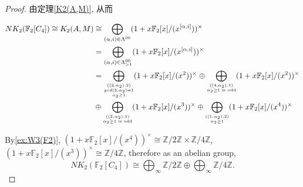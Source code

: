 \begin{proof}


由定理\ref{K2(A,M)}, 从而

\begin{align*}
NK_2(\mathbb{F}_2[C_4])\cong K_2(A,M) &\cong \bigoplus_{(\alpha,i)\in\Lambda^{00}}(1+x\mathbb{F}_2[x]/(x^{[\alpha,i]}))^{\times}\\
& = \bigoplus_{(\alpha,i)\in \Lambda^{00}_{>1}}(1+x\mathbb{F}_2[x]/(x^{[\alpha,i]}))^{\times}\\
& = \bigoplus_{\scriptsize\substack{((3,\alpha_2),2) \\ gcd(3,\alpha_2)=1 \\ \alpha_2\geq 1}}(1+x\mathbb{F}_2[x]/(x^{2}))^{\times}\oplus \bigoplus_{\scriptsize\substack{((4,\alpha_2),1) \\ \alpha_2\geq 1\text{ is odd}}}(1+x\mathbb{F}_2[x]/(x^{2}))^{\times} \\
& \oplus \bigoplus_{\scriptsize\substack{((2,\alpha_2),1) \\ \alpha_2\geq 1\text{ is odd}}}(1+x\mathbb{F}_2[x]/(x^{3}))^{\times} \oplus \bigoplus_{\scriptsize\substack{((1,\alpha_2),2) \\ \alpha_2\geq 1}}(1+x\mathbb{F}_2[x]/(x^{4}))^{\times}
\end{align*}

By\ref{ex:W3(F2)}, $(1+x\mathbb{F}_2[x]/(x^{4}))^{\times}\cong \mathbb{Z}/2 \mathbb{Z}\times \mathbb{Z}/4 \mathbb{Z}$, $(1+x\mathbb{F}_2[x]/(x^{3}))^{\times}\cong \mathbb{Z}/4 \mathbb{Z}$, therefore as an abelian group,
\[NK_2(\mathbb{F}_2[C_4]) \cong \bigoplus_{\infty} \mathbb{Z}/2 \mathbb{Z}\oplus \bigoplus_{\infty}\mathbb{Z}/4 \mathbb{Z}.\]





\end{proof}
